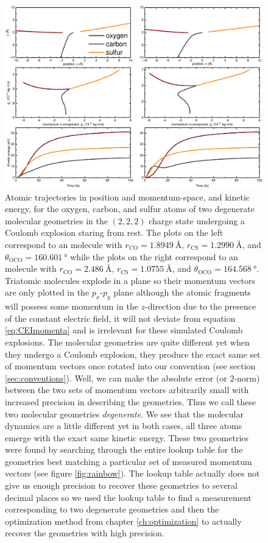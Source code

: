 \begin{figure}
  \centering
  \includegraphics[width=\textwidth]{Plots/DegenerateGeometryTrajectories.pdf}
  \caption[Atomic trajectories in position and momentum-space, and kinetic energy, of two degenerate molecular geometries undergoing a Coulomb explosion.]
  {Atomic trajectories in position and momentum-space, and kinetic energy, for the oxygen, carbon, and sulfur atoms of two degenerate  molecular geometries in the $(2,2,2)$ charge state undergoing a Coulomb explosion staring from rest. The plots on the left correspond to an  molecule with $r_\textrm{CO} = \SI{1.8949}{\angstrom}$, $r_\textrm{CS} = \SI{1.2990}{\angstrom}$, and $\theta_\mathrm{OCO} = \SI{160.601}{\degree}$ while the plots on the right correspond to an  molecule with $r_\textrm{CO} = \SI{2.486}{\angstrom}$, $r_\textrm{CS} = \SI{1.0755}{\angstrom}$, and $\theta_\mathrm{OCO} = \SI{164.568}{\degree}$. Triatomic molecules explode in a plane so their momentum vectors are only plotted in the $p_x$-$p_y$ plane although the atomic fragments will possess some momentum in the $z$-direction due to the presence of the constant electric field, it will not deviate from equation \eqref{eq:CEImomenta} and is irrelevant for these simulated Coulomb explosions. The molecular geometries are quite different yet when they undergo a Coulomb explosion, they produce the exact same set of momentum vectors once rotated into our convention (see section \ref{sec:conventions}). Well, we can make the absolute error (or $2$-norm) between the two sets of momentum vectors arbitrarily small with increased precision in describing the geometries. Thus we call these two molecular geometries \emph{degenerate}. We see that the molecular dynamics are a little different yet in both cases, all three atoms emerge with the exact same kinetic energy. These two geometries were found by searching through the entire lookup table for the geometries best matching a particular set of measured momentum vectors (see figure \ref{fig:rainbow}). The lookup table actually does not give us enough precision to recover these geometries to several decimal places so we used the lookup table to find a measurement corresponding to two degenerate geometries and then the optimization method from chapter \ref{ch:optimization} to actually recover the geometries with high precision.}

\end{figure}
